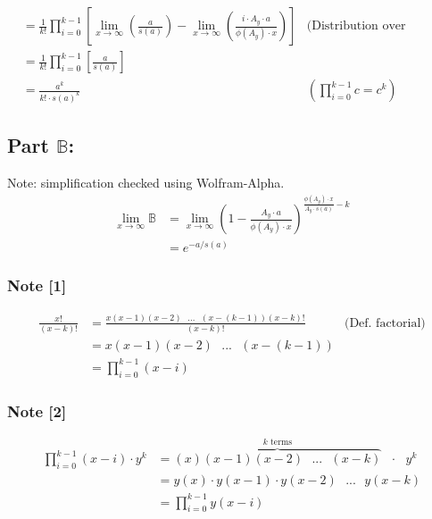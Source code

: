 \documentclass{article}
\theoremstyle{definition}
\begin{document}
\begin{align*}
                                  & = \frac{1}{k!} \prod_{i = 0}^{k-1} \left[  \lim_{x \to \infty} \left(   \frac{a}{ s(a)}\right) -  \lim_{x \to \infty}\left(\frac{i \cdot A_y \cdot a }{\phi(A_y) \cdot x} \right) \right]                         & \text{(Distribution over difference limit law)} \\
                                  & = \frac{1}{k!} \prod_{i = 0}^{k-1} \left[     \frac{a}{ s(a)} \right]\\
                                  & =\frac{a^k}{k! \cdot s(a)^k}                                                                                                                                                                                      & \left( \prod_{i = 0}^{k-1}c = c^k \right)
\end{align*}

\subsection*{Part $\mathbb{B}$:}
Note: simplification checked using Wolfram-Alpha.
\begin{align*}
    \lim_{x \to \infty} \mathbb{B} & = \lim_{x \to \infty}\left(1- \frac{A_y \cdot a}{\phi(A_y) \cdot x}\right)^{\frac{\phi(A_y) \cdot x}{A_y \cdot s(a)  } -k} \\
                                   & = e^{-a/s(a)}
\end{align*}

\subsubsection*{Note [1]}
\begin{align*}
    \frac{x!}{(x-k)!} & = \frac{x(x-1)(x-2) \text{ } ...\text{ } (x-(k-1))(x-k)!  }{(x-k)!} & \text{(Def. factorial)} \\
                      & = x(x-1)(x-2) \text{ } ...\text{ } (x-(k-1))                                                  \\
                      & = \prod_{i = 0}^{k-1}(x-i)
\end{align*}
\subsubsection*{Note [2]}\begin{align*}
    \prod_{i=0}^{k-1}(x-i) \cdot y^k & = \overbrace {(x)(x-1)(x-2) \text{ } ... \text{ } (x-k)}^{k \text{ terms}} \text{ } \cdot \text{ }y^k \\
                                     & = y(x) \cdot  y(x-1) \cdot y(x-2) \text{ } ... \text{ } y(x-k)                                        \\
                                     & = \prod_{i=0}^{k-1} y(x-i)
\end{align*}
\end{document}
